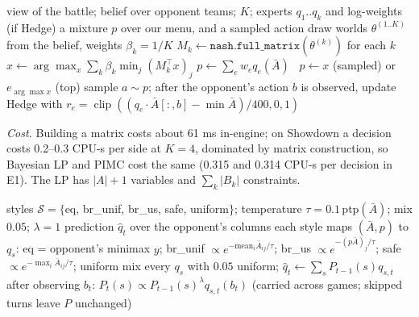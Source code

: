 \documentclass[10pt]{article}
\theoremstyle{plain}
\theoremstyle{definition}
\theoremstyle{remark}
\DeclareMathOperator{\clip}{clip}
\newcommand{\qhat}{\hat q}
\begin{document}
\begin{algorithm}[t]
\caption{One decision (Bayesian LP, with optional Hedge over experts)}\label{alg:turn}
\begin{algorithmic}[1]
\Require view of the battle; belief over opponent teams; $K$; experts $q_1..q_k$ and log-weights (if Hedge)
\Ensure a mixture $p$ over our menu, and a sampled action
\State draw worlds $\theta^{(1..K)}$ from the belief, weights $\beta_k=1/K$ 
\State $M_k\gets\texttt{nash.full\_matrix}(\theta^{(k)})$ for each $k$ 
\State $x\gets\arg\max_x\sum_k\beta_k\min_j(M_k^\top x)_j$ 
 $p\gets\sum_ew_eq_e(\bar A)$ 
\Else\ $p\gets x$ (sampled) or $e_{\arg\max x}$ (top) \EndIf
\State sample $a\sim p$; after the opponent's action $b$ is observed, update Hedge with $r_e=\clip((q_e\cdot\bar A[:,b]-\min\bar A)/400,0,1)$ 
\end{algorithmic}
\end{algorithm}
\emph{Cost.} Building a matrix costs about 61 ms in-engine; on Showdown a decision costs 0.2--0.3 CPU-s per side at
$K=4$, dominated by matrix construction, so Bayesian LP and PIMC cost the same (0.315 and 0.314 CPU-s per decision in E1).
The LP has $|A|+1$ variables and $\sum_k|B_k|$ constraints.

\begin{algorithm}[t]
\caption{Style posterior (\texttt{showdown/behavior.py})}\label{alg:style}
\begin{algorithmic}[1]
\Require styles $\mathcal S=\{$eq, br\_unif, br\_us, safe, uniform$\}$; temperature $\tau=0.1\,\mathrm{ptp}(\bar A)$; mix $0.05$; $\lambda=1$
\Ensure prediction $\qhat_t$ over the opponent's columns
\State each style maps $(\bar A,p)$ to $q_s$: eq = opponent's minimax $y$; br\_unif $\propto e^{-\mathrm{mean}_i\bar A_{ij}/\tau}$; br\_us $\propto e^{-(p\bar A)_j/\tau}$; safe $\propto e^{-\max_i\bar A_{ij}/\tau}$; uniform
\State mix every $q_s$ with $0.05$ uniform; $\qhat_t\gets\sum_sP_{t-1}(s)q_{s,t}$
\State after observing $b_t$: $P_t(s)\propto P_{t-1}(s)^\lambda q_{s,t}(b_t)$ (carried across games; skipped turns leave $P$ unchanged)
\end{algorithmic}
\end{algorithm}

\end{document}
